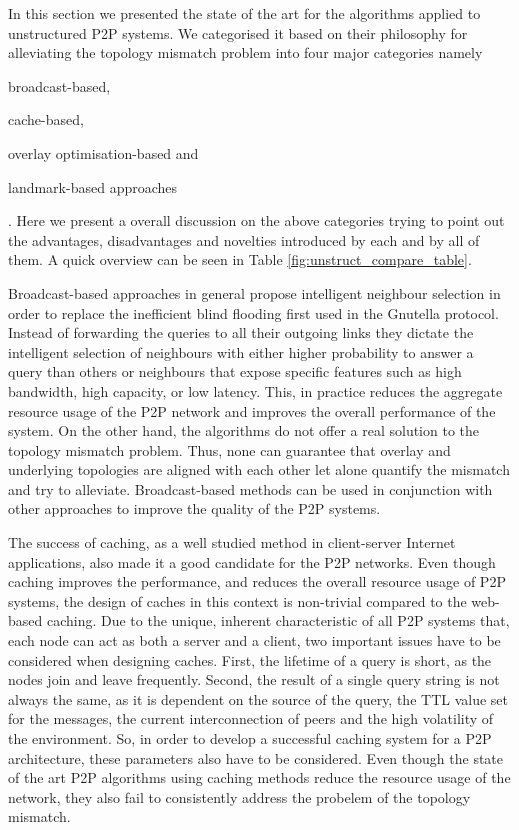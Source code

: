 \documentclass[acmcsur,acmnow]{acmtrans2m}
\begin{document}
In this section we presented the state of the art for the algorithms applied to unstructured P2P systems. We categorised it based on their philosophy for alleviating the topology mismatch problem into four major categories namely
\begin{inparaenum}
  \item broadcast-based,
  \item cache-based,
  \item overlay optimisation-based and
  \item landmark-based approaches
\end{inparaenum}
. Here we present a overall discussion on the above categories trying to point out the advantages, disadvantages and novelties introduced by each and by all of them. A quick overview can be seen in Table \ref{fig:unstruct_compare_table}.

Broadcast-based approaches in general propose intelligent neighbour
selection in order to replace the inefficient blind flooding first used in the Gnutella protocol. Instead of forwarding the queries to all their outgoing links they dictate the intelligent selection of neighbours with either higher probability to answer a query than others or neighbours  that expose specific features such as high bandwidth, high capacity, or low latency. This, in practice reduces the aggregate resource usage of the P2P network and improves the overall performance of the system. On the other hand, the algorithms do not offer a real solution to the topology mismatch problem. Thus, none can guarantee that overlay and underlying topologies are aligned with each other let alone quantify the mismatch and try to alleviate. Broadcast-based methods can be used in conjunction with other approaches to improve the quality of the P2P systems.

The success of caching, as a well studied method in client-server Internet
applications, also made it a good candidate for the P2P networks. Even
though caching improves the performance, and reduces the overall resource usage
of P2P systems, the design of caches in this context is non-trivial compared to the web-based caching. Due to the unique, inherent characteristic of all P2P systems that, each node can act as both a server and a client, two important issues have to be considered when designing caches. First, the lifetime of a query is short, as the nodes join and
leave frequently. Second, the result of a single query string is not always the
same, as it is dependent on the source of the query, the TTL value set for the messages, the current interconnection of peers and the high volatility of the environment. So, in order to develop a successful caching system for a P2P architecture, these parameters also have to be considered. Even though the state of the art P2P algorithms using caching methods reduce the resource usage of the network, they also fail to consistently address the probelem of the topology mismatch.
\end{document}

